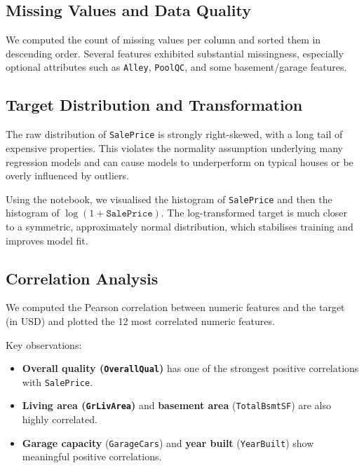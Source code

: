 \documentclass[11pt,a4paper]{article}
\begin{document}
\subsection{Missing Values and Data Quality}

We computed the count of missing values per column and sorted them in descending order.
Several features exhibited substantial missingness, especially optional attributes such as \texttt{Alley}, \texttt{PoolQC}, and some basement/garage features.

\subsection{Target Distribution and Transformation}
\label{sec:eda-target}

The raw distribution of \texttt{SalePrice} is strongly right-skewed, with a long tail of expensive properties.
This violates the normality assumption underlying many regression models and can cause models to underperform on typical houses or be overly influenced by outliers.

Using the notebook, we visualised the histogram of \texttt{SalePrice} and then the histogram of \(\log(1 + \texttt{SalePrice})\).
The log-transformed target is much closer to a symmetric, approximately normal distribution, which stabilises training and improves model fit.

\subsection{Correlation Analysis}

We computed the Pearson correlation between numeric features and the target (in USD) and plotted the 12 most correlated numeric features.

Key observations:

\begin{itemize}[leftmargin=*]
    \item \textbf{Overall quality (\texttt{OverallQual})} has one of the strongest positive correlations with \texttt{SalePrice}.
    \item \textbf{Living area (\texttt{GrLivArea})} and \textbf{basement area} (\texttt{TotalBsmtSF}) are also highly correlated.
    \item \textbf{Garage capacity} (\texttt{GarageCars}) and \textbf{year built} (\texttt{YearBuilt}) show meaningful positive correlations.
\end{itemize}
\end{document}
